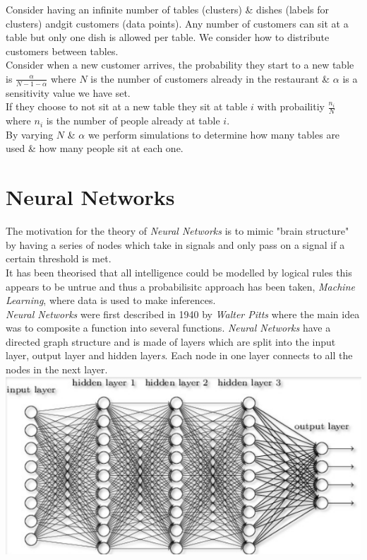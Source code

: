 \documentclass[11pt,a4paper]{article}
\begin{document}
Consider having an infinite number of tables (clusters) \& dishes (labels for clusters) andgit customers (data points). Any number of customers can sit at a table but only one dish is allowed per table. We consider how to distribute customers between tables.\\
Consider when a new customer arrives, the probability they start to a new table is $\frac{\alpha}{N-1-\alpha}$ where $N$ is the number of customers already in the restaurant \& $\alpha$ is a sensitivity value we have set.\\
If they choose to not sit at a new table they sit at table $i$ with probailitiy $\frac{n_i}{N}$ where $n_i$ is the number of people already at table $i$.\\
By varying $N$ \& $\alpha$ we perform simulations to determine how many tables are used \& how many people sit at each one.\\

\section{Neural Networks}

The motivation for the theory of \textit{Neural Networks} is to mimic "brain structure" by having a series of nodes which take in signals and only pass on a signal if a certain threshold is met.\\
It has been theorised that all intelligence could be modelled by logical rules this appears to be untrue and thus a probabilisitc approach has been taken, \textit{Machine Learning}, where data is used to make inferences.\\

\textit{Neural Networks} were first described in 1940 by \textit{Walter Pitts} where the main idea was to composite a function into several functions. \textit{Neural Networks} have a directed graph structure and is made of layers which are split into the input layer, output layer and hidden layer\textit{s}. Each node in one layer connects to all the nodes in the next layer.\\
\includegraphics[scale=.7]{img/neuralNetwork.png}
\end{document}
